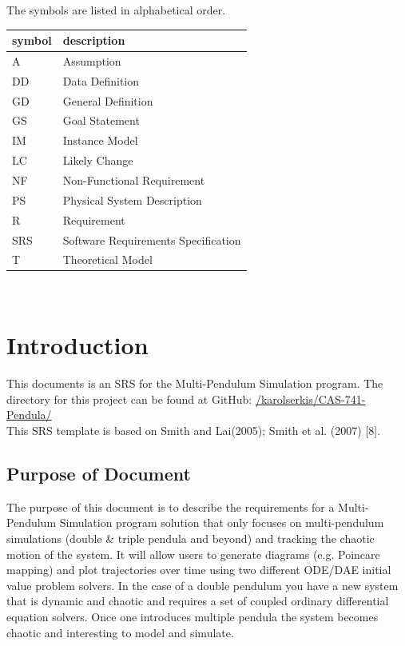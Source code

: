 \documentclass[12pt]{article}
\newcommand{\progname}{Multi-Pendulum Simulation }
\begin{document}
The symbols are listed in alphabetical order.\\

\renewcommand{\arraystretch}{1.2}
\begin{tabular}{l l} 
  \toprule		
  \textbf{symbol} & \textbf{description}\\
  \midrule 
  A & Assumption\\
  DD & Data Definition\\
  GD & General Definition\\
  GS & Goal Statement\\
  IM & Instance Model\\
  LC & Likely Change\\
  NF & Non-Functional Requirement\\
  PS & Physical System Description\\
  R & Requirement\\
  SRS & Software Requirements Specification\\
  T & Theoretical Model\\
  \bottomrule
\end{tabular}\\

\newpage


\setcounter{secnumdepth}{3}

\section{Introduction}

This documents is an SRS for the \progname program. The directory for this
project can
be found at GitHub:
\href{https://github.com/karolserkis/CAS-741-Pendula/}{/karolserkis/CAS-741-Pendula/}\\
This SRS template is based on Smith and Lai(2005); Smith et al. (2007) [8].

\subsection{Purpose of Document}
The purpose of this document is to describe the requirements for a
\progname program solution that
only focuses on multi-pendulum simulations (double \& triple pendula and beyond) and tracking the chaotic
motion of the system. It will allow users to generate diagrams (e.g. Poincare
mapping)
and plot trajectories over time using two different ODE/DAE initial value
problem solvers. In the case of
a double pendulum you have a new system that is dynamic and chaotic and
requires a set of coupled ordinary differential equation solvers. Once one
introduces
multiple
pendula the system becomes chaotic and interesting to model and simulate. 
\end{document}
